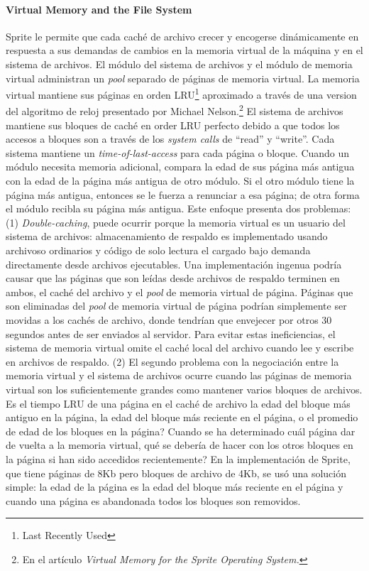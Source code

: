\paragraph{\textnormal{\textbf{Virtual Memory and the File System}}}
Sprite le permite que cada caché de archivo crecer y encogerse dinámicamente en respuesta a sus demandas de cambios en la memoria virtual de la máquina y en el sistema de archivos. El módulo del sistema de archivos y el módulo de memoria virtual administran un \emph{pool} separado de páginas de memoria virtual. La memoria virtual mantiene sus páginas en orden LRU\footnote{Last Recently Used} aproximado a través de una version del algoritmo de reloj presentado por Michael Nelson.\footnote{En el artículo \emph{Virtual Memory for the Sprite Operating System.}} El sistema de archivos mantiene sus bloques de caché en order LRU perfecto debido a que todos los accesos a bloques son a través de los \emph{system calls} de ``read'' y ``write''. Cada sistema mantiene un \emph{time-of-last-access} para cada página o bloque. Cuando un módulo necesita memoria adicional, compara la edad de sus página más antigua con la edad de la página más antigua de otro módulo. Si el otro módulo tiene la página más antigua, entonces se le fuerza a renunciar a esa página; de otra forma el módulo recibla su página más antigua. Este enfoque presenta dos problemas: (1) \emph{Double-caching}, puede ocurrir porque la memoria virtual es un usuario del sistema de archivos: almacenamiento de respaldo es implementado usando archivoso ordinarios y código de solo lectura el cargado bajo demanda directamente desde archivos ejecutables. Una implementación ingenua podría causar que las páginas que son leídas desde archivos de respaldo terminen en ambos, el caché del archivo y el \emph{pool} de memoria virtual de página. Páginas que son eliminadas del \emph{pool} de memoria virtual de página podrían simplemente ser movidas a los cachés de archivo, donde tendrían que envejecer por otros 30 segundos antes de ser enviados al servidor. Para evitar estas ineficiencias, el sistema de memoria virtual omite el caché local del archivo cuando lee y escribe en archivos de respaldo. (2) El segundo problema con la negociación entre la memoria virtual y el sistema de archivos ocurre cuando las páginas de memoria virtual son los suficientemente grandes como mantener varios bloques de archivos. Es el tiempo LRU de una página en el caché de archivo la edad del bloque más antiguo en la página, la edad del bloque más reciente en el página, o el promedio de edad de los bloques en la página? Cuando se ha determinado cuál página dar de vuelta a la memoria virtual, qué se debería de hacer con los otros bloques en la página si han sido accedidos recientemente? En la implementación de Sprite, que tiene páginas de 8Kb pero bloques de archivo de 4Kb, se usó una solución simple: la edad de la página es la edad del bloque más reciente en el página y cuando una página es abandonada todos los bloques son removidos.

